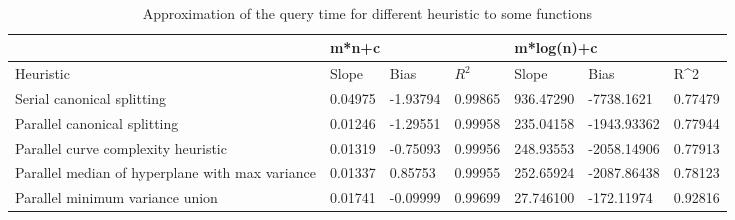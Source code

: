 \begin{table}[!ht]
\centering
\caption{Approximation of the query time for different heuristic to some functions}
~\\
\label{tab:neurons}
\begin{tabular}{l|lll|lll|}
\cline{2-7}
                                                                      & \multicolumn{3}{l|}{m*n+c}                                                          & \multicolumn{3}{l|}{m*log(n)+c}                                                          \\ \hline
\multicolumn{1}{|l|}{Heuristic}                                       & \multicolumn{1}{l|}{Slope}   & \multicolumn{1}{l|}{Bias}     & $R^2$ & \multicolumn{1}{l|}{Slope}     & \multicolumn{1}{l|}{Bias}        & R\textasciicircum{}2 \\ \hline
\multicolumn{1}{|l|}{Serial canonical splitting}                      & \multicolumn{1}{l|}{0.04975} & \multicolumn{1}{l|}{-1.93794} & 0.99865              & \multicolumn{1}{l|}{936.47290} & \multicolumn{1}{l|}{-7738.1621}  & 0.77479              \\ \hline
\multicolumn{1}{|l|}{Parallel canonical splitting}                    & \multicolumn{1}{l|}{0.01246} & \multicolumn{1}{l|}{-1.29551} & 0.99958              & \multicolumn{1}{l|}{235.04158} & \multicolumn{1}{l|}{-1943.93362} & 0.77944              \\ \hline
\multicolumn{1}{|l|}{Parallel curve complexity heuristic}             & \multicolumn{1}{l|}{0.01319} & \multicolumn{1}{l|}{-0.75093} & 0.99956              & \multicolumn{1}{l|}{248.93553} & \multicolumn{1}{l|}{-2058.14906} & 0.77913              \\ \hline
\multicolumn{1}{|l|}{Parallel median of hyperplane with max variance} & \multicolumn{1}{l|}{0.01337} & \multicolumn{1}{l|}{0.85753}  & 0.99955              & \multicolumn{1}{l|}{252.65924} & \multicolumn{1}{l|}{-2087.86438} & 0.78123              \\ \hline
\multicolumn{1}{|l|}{Parallel minimum variance union}                 & \multicolumn{1}{l|}{0.01741} & \multicolumn{1}{l|}{-0.09999} & 0.99699              & \multicolumn{1}{l|}{27.746100} & \multicolumn{1}{l|}{-172.11974}  & 0.92816              \\ \hline
\end{tabular}
\end{table}

